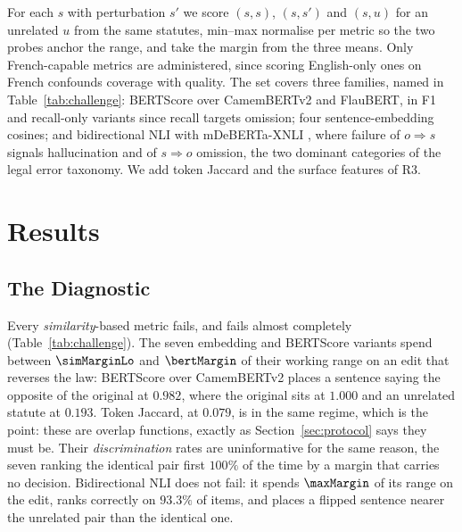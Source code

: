 \documentclass[11pt]{article}
\begin{document}
For each $s$ with perturbation $s'$ we score $(s,s)$, $(s,s')$ and $(s,u)$ for
an unrelated $u$ from the same statutes, min--max normalise per metric so the
two probes anchor the range, and take the margin from the three means. Only
French-capable metrics are administered, since scoring English-only ones on
French confounds coverage with quality. The set covers three families, named in
Table~\ref{tab:challenge}: BERTScore
\citep{zhang2019bertscore} over CamemBERTv2 and FlauBERT, in F1 and recall-only
variants since recall targets omission; four sentence-embedding cosines; and
bidirectional NLI with mDeBERTa-XNLI \citep{laurer2024nli}, where failure of
$o \Rightarrow s$ signals hallucination and of $s \Rightarrow o$ omission, the
two dominant categories of the legal error taxonomy. We add token Jaccard and
the surface features of R3.

\section{Results}
\label{sec:results}

\subsection{The Diagnostic}
\label{sec:diagnostic}

Every \emph{similarity}-based metric fails, and fails almost completely
(Table~\ref{tab:challenge}). The seven embedding and BERTScore variants spend
between $\simMarginLo$ and $\bertMargin$ of their working range on an edit that
reverses the law: BERTScore over CamemBERTv2 places a sentence saying the
opposite of the original at $0.982$, where the original sits at $1.000$ and an
unrelated statute at $0.193$. Token Jaccard, at $0.079$, is in the same regime,
which is the point: these are overlap functions, exactly as
Section~\ref{sec:protocol} says they must be. Their \emph{discrimination} rates
are uninformative for the same reason, the seven ranking the identical pair
first $100\%$ of the time by a margin that carries no decision.
Bidirectional NLI does not fail: it spends $\maxMargin$ of its range on the
edit, ranks correctly on $93.3\%$ of items, and places a flipped sentence nearer
the unrelated pair than the identical one.

\begin{table}[tb]\centering\footnotesize

\caption{Margin over the \nMetricsChallenged\ scorers of
Table~\ref{tab:challenge}; selected rules, same-direction pairs pooled. All
\nRules\ rules are in the supplementary material.}
\label{tab:rules}
\end{table}
\end{document}
